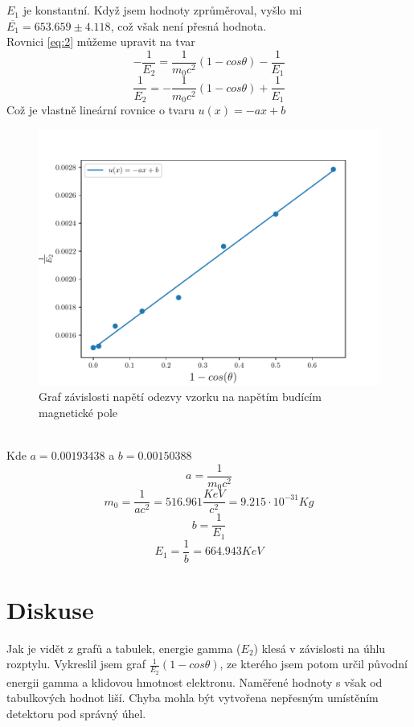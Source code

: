 \documentclass{article}
\begin{document}
\\
\vspace{1em}
\\
$E_{1}$ je konstantní. Když jsem hodnoty zprůměroval, vyšlo mi\\
$\overline{E_{1}} = 653.659 \pm 4.118$, což však není přesná hodnota.
\newpage
\\
Rovnici \ref{eq:2} můžeme upravit na tvar\\
$$- \frac{1}{E_{2}} = \frac{1}{m_{0}c^{2}} (1-cos\theta) - \frac{1}{E_{1}}$$
$$\frac{1}{E_{2}} = -\frac{1}{m_{0}c^{2}} (1-cos\theta) + \frac{1}{E_{1}}$$
Což je vlastně lineární rovnice o tvaru $u(x) = -ax + b$
\begin{figure}[h]
  \hspace*{-1em}
  \includegraphics[scale=0.8]{figs/fig2.pdf}
  \caption{Graf závislosti napětí odezvy vzorku na napětím budícím magnetické pole}
\end{figure}
\\
Kde $a = 0.00193438$ a $b = 0.00150388$\\
$$a = \frac{1}{m_{0}c^{2}}$$
$$m_{0} = \frac{1}{ac^{2}} = 516.961 \frac{KeV}{c^{2}} = 9.215 \cdot 10^{-31} Kg$$
$$b = \frac{1}{E_{1}}$$
$$E_{1} = \frac{1}{b} = 664.943 KeV$$
\newpage
\section{Diskuse}
Jak je vidět z grafů a tabulek, energie gamma ($E_{2}$) klesá v závislosti na úhlu rozptylu.
Vykreslil jsem graf $\frac{1}{E_{2}}(1-cos\theta)$, ze kterého jsem potom určil původní
energii gamma a klidovou hmotnost elektronu. Naměřené hodnoty s však od tabulkových
hodnot liší. Chyba mohla být vytvořena nepřesným umístěním detektoru pod správný úhel.
\end{document}
